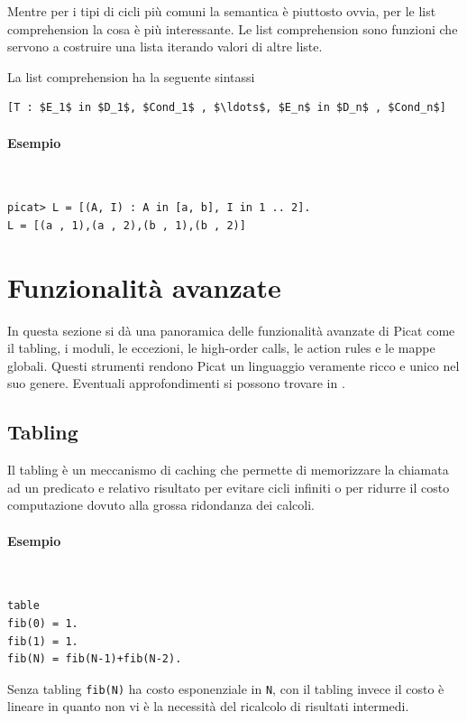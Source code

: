 \documentclass[12pt,a4paper,openright]{book}  %
\begin{document}
Mentre per i tipi di cicli più comuni la semantica è piuttosto ovvia,
per le list comprehension la cosa è più interessante. Le list
comprehension sono funzioni che servono a costruire una lista iterando
valori di altre liste.

La list comprehension ha la seguente sintassi
\begin{lstlisting}
[T : $E_1$ in $D_1$, $Cond_1$ , $\ldots$, $E_n$ in $D_n$ , $Cond_n$]
\end{lstlisting}

\paragraph{Esempio}\
\begin{lstlisting}
picat> L = [(A, I) : A in [a, b], I in 1 .. 2].
L = [(a , 1),(a , 2),(b , 1),(b , 2)]
\end{lstlisting}

\section{Funzionalità avanzate}
\label{sec:picat_advanced}

In questa sezione si dà una panoramica delle funzionalità avanzate di
Picat come il tabling, i moduli, le eccezioni, le high-order calls, le
action rules e le mappe globali. Questi strumenti rendono Picat un
linguaggio veramente ricco e unico nel suo genere. Eventuali
approfondimenti si possono trovare in \cite{PicatGuide}.

\subsection{Tabling}
\label{subsec:picat_advanced_tabling}

Il tabling è un meccanismo di caching che permette di memorizzare la
chiamata ad un predicato e relativo risultato per evitare cicli
infiniti o per ridurre il costo computazione dovuto alla grossa
ridondanza dei calcoli.

\paragraph{Esempio}\
\begin{lstlisting}
table
fib(0) = 1.
fib(1) = 1.
fib(N) = fib(N-1)+fib(N-2).
\end{lstlisting}
Senza tabling \verb|fib(N)| ha costo esponenziale in \verb|N|, con il
tabling invece il costo è lineare in quanto non vi è la necessità del
ricalcolo di risultati intermedi.
\end{document}
